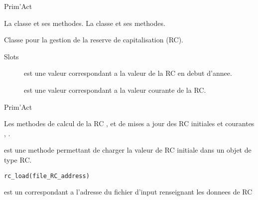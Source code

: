 \documentclass[a4paper]{book}
\begin{document}
%
\begin{Author}\relax
Prim'Act
\end{Author}
%
\begin{SeeAlso}\relax
La classe  et ses methodes.
La classe  et ses methodes.
\end{SeeAlso}
%
\begin{Description}\relax
Classe pour la gestion de la reserve de capitalisation (RC).
\end{Description}
%
\begin{Section}{Slots}

\begin{description}

\item[] est une valeur  correspondant a la valeur de la RC en debut d'annee.

\item[] est une valeur  correspondant a la valeur courante de la RC.

\end{description}
\end{Section}
%
\begin{Author}\relax
Prim'Act
\end{Author}
%
\begin{SeeAlso}\relax
Les methodes de calcul de la RC , et de mises a jour des RC initiales et courantes , .
\end{SeeAlso}
%
\begin{Description}\relax
{} est une methode permettant de charger la valeur de RC initiale dans un objet de type RC.
\end{Description}
%
\begin{Usage}
\begin{verbatim}
rc_load(file_RC_address)
\end{verbatim}
\end{Usage}
%
\begin{Arguments}
\begin{ldescription}
\item[\code{file\_RC\_address}] est un  correspondant a l'adresse du fichier d'input renseignant les donnees de RC
\end{ldescription}
\end{Arguments}
\end{document}
